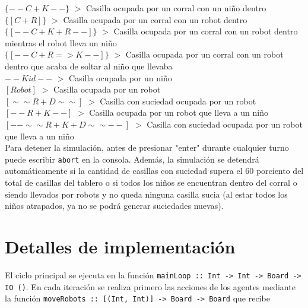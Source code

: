 \documentclass[a4paper,12pt]{article}
\def\code#1{\texttt{#1}}
\begin{document}
\code{$\{--C+K--\}$} $>$ Casilla ocupada por un corral con un niño dentro\\

\code{$\{[C+R]\}$} $>$ Casilla ocupada por un corral con un robot dentro\\

\code{$\{[--C+K+R--]\}$} $>$ Casilla ocupada por un corral con un robot dentro mientras el robot lleva un niño\\

\code{$\{[--C+R=>K--]\}$} $>$ Casilla ocupada por un corral con un robot dentro que acaba de soltar al niño que llevaba\\

\code{$--Kid--$} $>$ Casilla ocupada por un niño\\

\code{$[Robot]$} $>$ Casilla ocupada por un robot\\

\code{$[\sim\sim R+D\sim\sim ]$} $>$ Casilla con suciedad ocupada por un robot\\

\code{$[--R+K--]$} $>$ Casilla ocupada por un robot que lleva a un niño\\

\code{$[--\sim\sim R+K+D \sim\sim -- ]$} $>$ Casilla con suciedad ocupada por un robot que lleva a un niño\\


Para detener la simulación, antes de presionar "enter" durante cualquier turno puede escribir \code{abort} en la consola. Además, la simulación se detendrá automáticamente si la cantidad de casillas con suciedad supera el 60 porciento del total de casillas del tablero o si todos los niños se encuentran dentro del corral o siendo llevados por robots y no queda ninguna casilla sucia (al estar todos los niños atrapados, ya no se podrá generar suciedades nuevas).


\section*{Detalles de implementación}
El ciclo principal se ejecuta en la función \code{mainLoop :: Int -> Int -> Board -> IO ()}. En cada iteración se realiza primero las acciones de los agentes mediante la función \code{moveRobots :: [(Int, Int)] -> Board -> Board} que recibe
\end{document}
